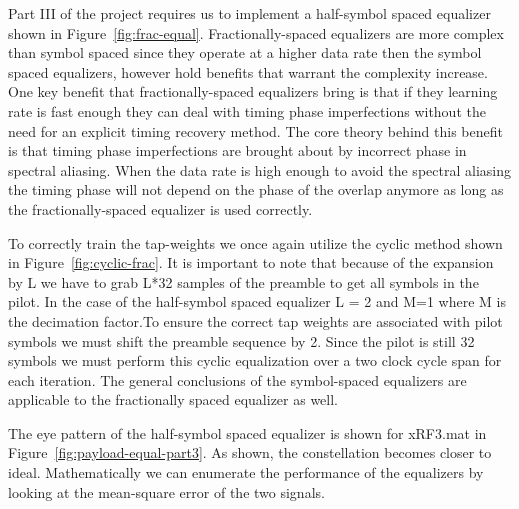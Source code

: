 Part III of the project requires us to implement a half-symbol spaced equalizer shown in Figure~\ref{fig:frac-equal}. Fractionally-spaced equalizers are more complex than symbol spaced since they operate at a higher data rate then the symbol spaced equalizers, however hold benefits that warrant the complexity increase. One key benefit that fractionally-spaced equalizers bring is that if they learning rate is fast enough they can deal with timing phase imperfections without the need for an explicit timing recovery method. The core theory behind this benefit is that timing phase imperfections are brought about by incorrect phase in spectral aliasing. When the data rate is high enough to avoid the spectral aliasing the timing phase will not depend on the phase of the overlap anymore as long as the fractionally-spaced equalizer is used correctly.

To correctly train the tap-weights we once again utilize the cyclic method shown in Figure~\ref{fig:cyclic-frac}. It is important to note that because of the expansion by L we have to grab L*32 samples of the preamble to get all symbols in the pilot. In the case of the half-symbol spaced equalizer L = 2 and M=1 where M is the decimation factor.To ensure the correct tap weights are associated with pilot symbols we must shift the preamble sequence by 2. Since the pilot is still 32 symbols we must perform this cyclic equalization over a two clock cycle span for each iteration. The general conclusions of the symbol-spaced equalizers are applicable to the fractionally spaced equalizer as well.

The eye pattern of the half-symbol spaced equalizer is shown for xRF3.mat in Figure~\ref{fig:payload-equal-part3}. As shown, the constellation becomes closer to ideal. Mathematically we can enumerate the performance of the equalizers by looking at the mean-square error of the two signals. 